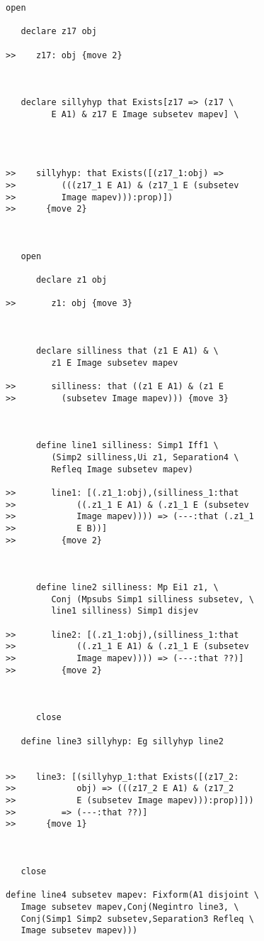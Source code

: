 \documentclass[12pt]{article}
\begin{document}
\begin{verbatim}
open

   declare z17 obj

>>    z17: obj {move 2}



   declare sillyhyp that Exists[z17 => (z17 \
         E A1) & z17 E Image subsetev mapev] \
      



>>    sillyhyp: that Exists([(z17_1:obj) =>
>>         (((z17_1 E A1) & (z17_1 E (subsetev
>>         Image mapev))):prop)])
>>      {move 2}



   open

      declare z1 obj

>>       z1: obj {move 3}



      declare silliness that (z1 E A1) & \
         z1 E Image subsetev mapev

>>       silliness: that ((z1 E A1) & (z1 E
>>         (subsetev Image mapev))) {move 3}



      define line1 silliness: Simp1 Iff1 \
         (Simp2 silliness,Ui z1, Separation4 \
         Refleq Image subsetev mapev)

>>       line1: [(.z1_1:obj),(silliness_1:that
>>            ((.z1_1 E A1) & (.z1_1 E (subsetev
>>            Image mapev)))) => (---:that (.z1_1
>>            E B))]
>>         {move 2}



      define line2 silliness: Mp Ei1 z1, \
         Conj (Mpsubs Simp1 silliness subsetev, \
         line1 silliness) Simp1 disjev

>>       line2: [(.z1_1:obj),(silliness_1:that
>>            ((.z1_1 E A1) & (.z1_1 E (subsetev
>>            Image mapev)))) => (---:that ??)]
>>         {move 2}



      close

   define line3 sillyhyp: Eg sillyhyp line2


>>    line3: [(sillyhyp_1:that Exists([(z17_2:
>>            obj) => (((z17_2 E A1) & (z17_2
>>            E (subsetev Image mapev))):prop)]))
>>         => (---:that ??)]
>>      {move 1}



   close

define line4 subsetev mapev: Fixform(A1 disjoint \
   Image subsetev mapev,Conj(Negintro line3, \
   Conj(Simp1 Simp2 subsetev,Separation3 Refleq \
   Image subsetev mapev)))


\end{verbatim}
\end{document}
